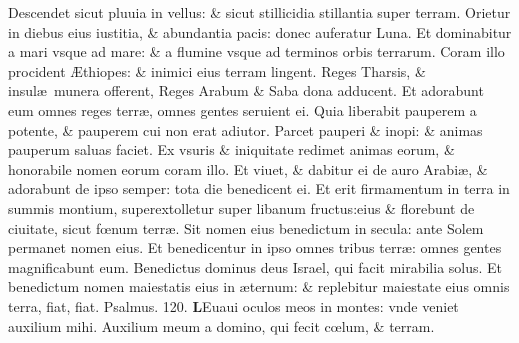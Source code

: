 \documentclass[a5paper,10pt]{book}
\def\ae{æ}
\def\AE{Æ}
\def\oe{œ}
\begin{document}
\begin{multicols*}{2}
\newline \color{red} D\color{black}escendet sicut pluuia in vellus: \& sicut stillicidia stillantia super terram.
\newline \color{red} O\color{black}rietur in diebus eius iustitia, \& abundantia pacis: donec auferatur Luna.
\newline \color{red} E\color{black}t dominabitur a mari vsque ad mare: \& a flumine vsque ad terminos orbis terrarum.
\newline \color{red} C\color{black}oram illo procident \AE thiopes: \& inimici eius terram lingent.
\newline \color{red} R\color{black}eges Tharsis, \& insul\ae \ munera offerent, Reges Arabum \& Saba dona adducent.
\newline \color{red} E\color{black}t adorabunt eum omnes reges terr\ae , omnes gentes seruient ei.
\newline \color{red} Q\color{black}uia liberabit pauperem a potente, \& pauperem cui non erat adiutor.
\newline \color{red} P\color{black}arcet pauperi \& inopi: \& animas pauperum saluas faciet.
\newline \color{red} E\color{black}x vsuris \& iniquitate redimet animas eorum, \& honorabile nomen eorum coram illo.
\newline \color{red} E\color{black}t viuet, \& dabitur ei de auro Arabi\ae , \& adorabunt de ipso semper: tota die benedicent ei.
\newline \color{red} E\color{black}t erit firmamentum in terra in summis montium, superextolletur super libanum fructus:eius \& florebunt de ciuitate, sicut f\oe num terr\ae .
\newline \color{red} S\color{black}it nomen eius benedictum in secula: ante Solem permanet nomen eius.
\newline \color{red} E\color{black}t benedicentur in ipso omnes tribus terr\ae : omnes gentes magnificabunt eum.
\newline \color{red} B\color{black}enedictus dominus deus Israel, qui facit mirabilia solus.
\newline \color{red} E\color{black}t benedictum nomen maiestatis eius in \ae ternum: \& replebitur maiestate eius omnis terra, fiat, fiat.
\newline \color{red} Psalmus. \hypertarget{ps120}{120.} \color{black}
\vspace{-1em}
\lettrine[lines=2]{\bfseries \color{red} L}{}Euaui oculos meos in montes: vnde veniet auxilium mihi.
\newline \color{red} A\color{black}uxilium meum a domino, qui fecit c\oe lum, \& terram.

\end{multicols*}
\end{document}
